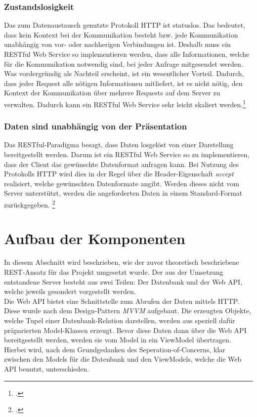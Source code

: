 \subsubsection*{Zustandslosigkeit}
Das zum Datenaustausch genutzte Protokoll \ac{HTTP} ist statuslos. Das bedeutet, dass kein Kontext bei der Kommunikation besteht bzw. jede Kommunikation unabhängig von vor- oder nachherigen Verbindungen ist. Deshalb muss ein \ac{REST}ful Web Service so implementieren werden, dass alle Informationen, welche für die Kommunikation notwendig sind, bei jeder Anfrage mitgesendet werden. Was vordergründig als Nachteil erscheint, ist ein wesentlicher Vorteil. Dadurch, dass jeder Request alle nötigen Informationen mitliefert, ist es nicht nötig, den Kontext der Kommunikation über mehrere Requests auf dem Server zu verwalten. Dadurch kann ein \ac{REST}ful Web Service sehr leicht skaliert werden.\footcite[S. 26ff.]{REST-und-HTTP}
\subsubsection*{Daten sind unabhängig von der Präsentation}
Das \ac{REST}ful-Paradigma besagt, dass Daten losgelöst von einer Darstellung bereitgestellt werden. Darum ist ein \ac{REST}ful Web Service so zu implementieren, dass der Client das gewünschte Datenformat anfragen kann. Bei Nutzung des Protokolls HTTP wird dies in der Regel über die Header-Eigenschaft \textit{accept} realisiert, welche gewünschten Datenformate angibt. Werden dieses nicht vom Server unterstützt, werden die angeforderten Daten in einem Standard-Format zurückgegeben. \footcite[S. 26ff.]{REST-und-HTTP}
\section{Aufbau der Komponenten}
\label{sec:aufbau-Komponenten}
In diesem Abschnitt wird beschrieben, wie der zuvor theoretisch beschriebene \ac{REST}-Ansatz für das Projekt umgesetzt wurde. Der aus der Umsetzung entstandene Server besteht aus zwei Teilen: Der Datenbank und der Web \ac{API}, welche jeweils gesondert vorgestellt werden. \\
Die Web \ac{API} bietet eine Schnittstelle zum Abrufen der Daten mittels \ac{HTTP}. Diese wurde nach dem Design-Pattern \textit{\ac{MVVM}} aufgebaut. Die erzeugten Objekte, welche Tupel einer Datenbank-Relation darstellen, werden aus speziell dafür präparierten Model-Klassen erzeugt. Bevor diese Daten dann über die Web \ac{API} bereitgestellt werden, werden sie vom Model in ein ViewModel übertragen. Hierbei wird, nach dem Grundgedanken des \gls{Seperation-of-Concerns}, klar zwischen den Models für die Datenbank und den ViewModels, welche die Web \ac{API} benutzt, unterschieden.
